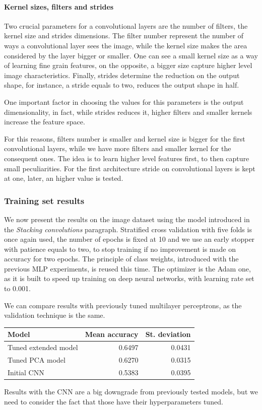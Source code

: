 \paragraph{Kernel sizes, filters and strides}
Two crucial parameters for a convolutional layers are the number of filters, 
the kernel size and strides dimensions. 
The filter number represent the number of ways a 
convolutional layer sees the image, while the kernel size makes the area 
considered by the layer bigger or smaller. One can see a small kernel size as a way 
of learning fine grain features, on the opposite, a bigger size capture higher level image characteristics.
Finally, strides determine the reduction on the output shape, for instance, a stride equals to 
two, reduces the output shape in half.

One important factor in choosing the values for this parameters is the output dimensionality, 
in fact, while strides reduces it, higher filters and smaller kernels increase 
the feature space.

For this reasons, filters number is smaller and kernel size is bigger for the first 
convolutional layers, while we have more filters and smaller kernel for the consequent ones.
The idea is to learn higher level features first, to then capture small peculiarities.
For the first architecture stride on convolutional layers is kept at one, later, an higher value is tested.

\subsubsection{Training set results}
We now present the results on the image dataset using the model introduced in 
the \emph{Stacking convolutions} paragraph. Stratified 
cross validation with five folds is once again used, the number of epochs 
is fixed at 10 and we use an early stopper with patience equals to two, to stop training 
if no improvement is made on accuracy for two epochs. The principle of 
class weights, introduced with the previous MLP experiments, is reused this time.
The optimizer is the Adam one, as it is built to speed up training on 
deep neural networks, with learning rate set to 0.001.

We can compare results with previously tuned multilayer perceptrons, as the validation
technique is the same.
\begin{center}
    \begin{tabular}{ |l|r|r| } 
        \hline
        Model & Mean accuracy & St. deviation \\
        \hline
        Tuned extended model& 0.6497 & 0.0431 \\
        Tuned PCA model & 0.6270 & 0.0315 \\
        Initial CNN & 0.5383 & 0.0395 \\
        \hline
    \end{tabular}
\end{center}
Results with the CNN are a big downgrade from previously tested models, 
but we need to consider the fact that those have their 
hyperparameters tuned.

